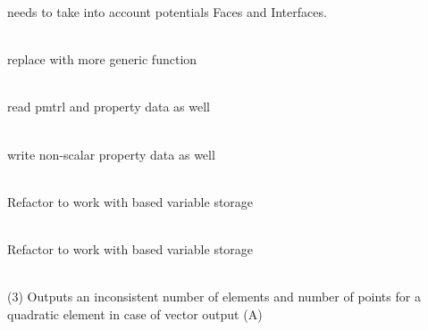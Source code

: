 \begin{DoxyRefList}
needs to take into account potentials Faces and Interfaces.  
\item[Member \doxylink{classcsmp_1_1_vector_variable_3_013_u_01_4_a1d69d50797a81ddc146071aec74f2ceb}{csmp\+::Vector\+Variable\texorpdfstring{$<$}{<} 3U \texorpdfstring{$>$}{>}\+::Euclidean\+Normalize} ()]\hfill \\
\label{todo__todo000031}%
%
replace with more generic function  
\item[Member \doxylink{classcsmp_1_1_v_set_a35e642227b0475434ac4de1f943b5b14}{csmp\+::VSet\texorpdfstring{$<$}{<} dim \texorpdfstring{$>$}{>}\+::Input\+From\+Text\+File} (const char \texorpdfstring{$\ast$}{*}file\+\_\+dot\+\_\+txt)]\hfill \\
\label{todo__todo000087}%
%
read \textquotesingle{}pmtrl\textquotesingle{} and property data as well 
\item[Member \doxylink{classcsmp_1_1_v_set_a3e761eabf0f84f3192c1ff9d55062886}{csmp\+::VSet\texorpdfstring{$<$}{<} dim \texorpdfstring{$>$}{>}\+::Out} (bool data\+\_\+as\+\_\+well=true) const]\hfill \\
\label{todo__todo000088}%
%
write non-\/scalar property data as well 
\item[Member \doxylink{classcsmp_1_1_v_set_a56928e1c755e628dcd551077a69704d9}{csmp\+::VSet\texorpdfstring{$<$}{<} dim \texorpdfstring{$>$}{>}\+::Parallel\+Input\+From} (const char \texorpdfstring{$\ast$}{*}bin\+\_\+file, double \&time, size\+\_\+t \&first\+\_\+outerhalo)]\hfill \\
\label{todo__todo000086}%
%
Refactor to work with  based variable storage  
\item[Member \doxylink{classcsmp_1_1_v_set_a2288211530bdce3c1d1d63258ab93bca}{csmp\+::VSet\texorpdfstring{$<$}{<} dim \texorpdfstring{$>$}{>}\+::Parallel\+Output\+To} (const char \texorpdfstring{$\ast$}{*}bin\+\_\+file, double time, size\+\_\+t first\+\_\+outerhalo) const]\hfill \\
\label{todo__todo000085}%
%
Refactor to work with  based variable storage 
\item[Class \doxylink{classcsmp_1_1_v_t_k___interface}{csmp\+::VTK\+\_\+\+Interface\texorpdfstring{$<$}{<} dim \texorpdfstring{$>$}{>}} ]\hfill \\
\label{todo__todo000034}%
%
(3) Outputs an inconsistent number of elements and number of points for a quadratic element in case of vector output (A) 




\end{DoxyRefList}
